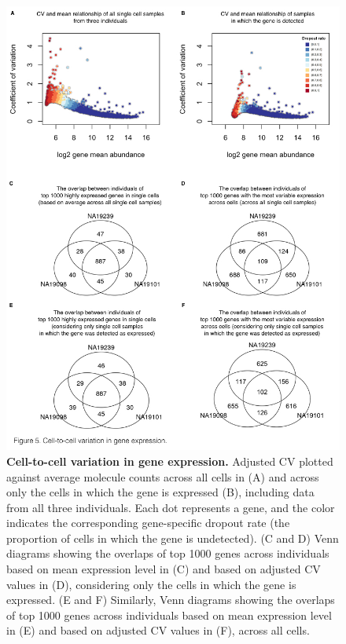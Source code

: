 \begin{figure}[htbp]
\centering
\includegraphics[trim=0 .5in 0 0,clip,width=5in]{img/ch04/Figure05.jpeg}
\caption[Cell-to-cell variation in gene expression.]{\textbf{Cell-to-cell variation in gene expression.}
Adjusted CV plotted against average molecule counts across all cells in
(A) and across only the cells in which the gene is expressed (B),
including data from all three individuals. Each dot represents a gene,
and the color indicates the corresponding gene-specific dropout rate
(the proportion of cells in which the gene is undetected). (C and D)
Venn diagrams showing the overlaps of top 1000 genes across individuals
based on mean expression level in (C) and based on adjusted CV values in
(D), considering only the cells in which the gene is expressed. (E and
F) Similarly, Venn diagrams showing the overlaps of top 1000 genes
across individuals based on mean expression level in (E) and based on
adjusted CV values in (F), across all cells.}
\label{fig:variation}
\end{figure}

